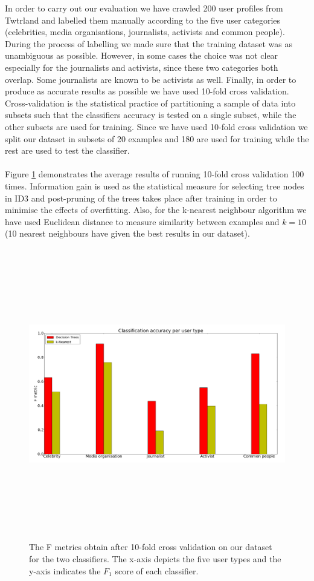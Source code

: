 In order to carry out our evaluation we have crawled 200 user profiles from Twtrland and labelled them manually according to the five user categories (celebrities, media organisations, journalists, activists and common people). During the process of labelling we made sure that the training dataset was as unambiguous as possible. However, in some cases the choice was not clear especially for the journalists and activists, since these two categories both overlap. Some journalists are known to be activists as well. Finally, in order to produce as accurate results as possible we have used 10-fold cross validation. Cross-validation is the statistical practice of partitioning a sample of data into subsets such that the classifiers accuracy is tested on a single subset, while the other subsets are used for training. Since we have used 10-fold cross validation we split our dataset in subsets of 20 examples and 180 are used for training while the rest are used to test the classifier.\\\\
Figure \ref{DifferentClassifiersResults} demonstrates the average results of running 10-fold cross validation 100 times. Information gain is used as the statistical measure for selecting tree nodes in ID3 and post-pruning of the trees takes place after training in order to minimise the effects of overfitting. Also, for the k-nearest neighbour algorithm we have used Euclidean distance to measure similarity between examples and $k=10$ (10 nearest neighbours have given the best results in our dataset). 
\begin{figure}[htbp]
  \begin{center}
    \includegraphics[height=5in, width=6in]{classifiers_bad}
    \caption{The F metrics obtain after 10-fold cross validation on our dataset for the two classifiers. The x-axis depicts the five user types and the y-axis indicates the $F_1$ score of each classifier.}
    \label{DifferentClassifiersResults}
  \end{center}
\end{figure}
